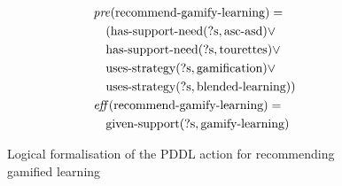 \begin{figure}[t]
  \small  %
  \begin{align*}
  &\mathit{pre}(\text{recommend-gamify-learning}) = \\
  &\quad (\text{has-support-need}(\text{?s}, \text{asc-asd}) \lor \\
  &\quad \text{has-support-need}(\text{?s}, \text{tourettes}) \lor \\
  &\quad \text{uses-strategy}(\text{?s}, \text{gamification}) \lor \\
  &\quad \text{uses-strategy}(\text{?s}, \text{blended-learning})) \\
  &\mathit{eff}(\text{recommend-gamify-learning}) = \\
  &\quad \text{given-support}(\text{?s}, \text{gamify-learning})
  \end{align*}
  \caption{Logical formalisation of the PDDL action for recommending gamified learning}\label{fig:gamify-learning}
\end{figure}